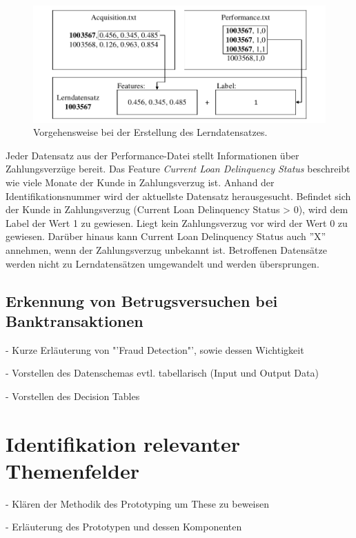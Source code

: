 \begin{figure}[ht]
\centering
\includegraphics{images/cleansing.pdf}
\caption{Vorgehensweise bei der Erstellung des Lerndatensatzes.}
\label{fig:cleansing}
\end{figure}  

Jeder Datensatz aus der Performance-Datei stellt Informationen über Zahlungsverzüge bereit. Das Feature \textit{Current Loan Delinquency Status} beschreibt wie viele Monate der Kunde in Zahlungsverzug ist. Anhand der Identifikationsnummer wird der aktuellste Datensatz herausgesucht. Befindet sich der Kunde in Zahlungsverzug (Current Loan Delinquency Status > 0), wird dem Label der Wert 1 zu gewiesen. Liegt kein Zahlungsverzug vor wird der Wert 0 zu gewiesen. Darüber hinaus kann Current Loan Delinquency Status auch ''X'' annehmen, wenn der Zahlungsverzug unbekannt ist. Betroffenen Datensätze werden nicht zu Lerndatensätzen umgewandelt und werden übersprungen.     

\subsection{Erkennung von Betrugsversuchen bei Banktransaktionen}
\label{subsec:Banktransaktionen3}

- Kurze Erläuterung von "'Fraud Detection"', sowie dessen Wichtigkeit

- Vorstellen des Datenschemas evtl. tabellarisch (Input und Output Data) 

- Vorstellen des Decision Tables

\section{Identifikation relevanter Themenfelder}
\label{subsec:Themenfelder3}

- Klären der Methodik des Prototyping um These zu beweisen

- Erläuterung des Prototypen und dessen Komponenten 
 
